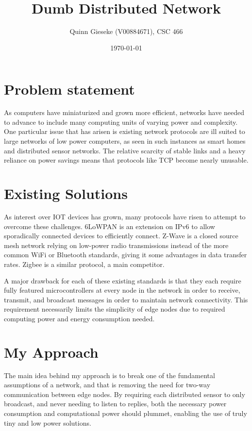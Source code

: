 \documentclass{article}
\begin{document}
\title{Dumb Distributed Network}

\author{Quinn Gieseke (V00884671), CSC 466}

\date{\today}

\maketitle
\section{Problem statement}
As computers have miniaturized and grown more efficient, networks have needed to advance to include many computing units of varying power and complexity. One particular issue that has arisen is existing network protocols are ill suited to large networks of low power computers, as seen in such instances as smart homes and distributed sensor networks. The relative scarcity of stable links and a heavy reliance on power savings means that protocols like TCP become nearly unusable.

\section{Existing Solutions}
As interest over IOT devices has grown, many protocols have risen to attempt to overcome these challenges. 6LoWPAN is an extension on IPv6 to allow sporadically connected devices to efficiently connect. Z-Wave is a closed source mesh network relying on low-power radio transmissions instead of the more common WiFi or Bluetooth standards, giving it some advantages in data transfer rates. Zigbee is a similar protocol, a main competitor.

A major drawback for each of these existing standards is that they each require fully featured microcontrollers at every node in the network in order to receive, transmit, and broadcast messages in order to maintain network connectivity. This requirement necessarily limits the simplicity of edge nodes due to required computing power and energy consumption needed.

\section{My Approach}
The main idea behind my approach is to break one of the fundamental assumptions of a network, and that is removing the need for two-way communication between edge nodes. By requiring each distributed sensor to only broadcast, and never needing to listen to replies, both the necessary power consumption and computational power should plummet, enabling the use of truly tiny and low power solutions. 
\end{document}
